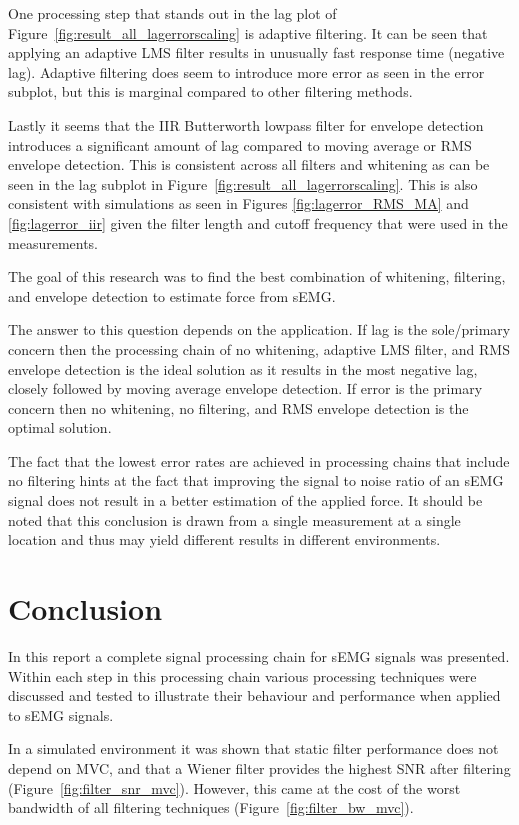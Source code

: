 One processing step that stands out in the lag plot of Figure~\ref{fig:result_all_lagerrorscaling} is adaptive filtering. It can be seen that applying an adaptive LMS filter results in unusually fast response time (negative lag). Adaptive filtering does seem to introduce more error as seen in the error subplot, but this is marginal compared to other filtering methods.

Lastly it seems that the IIR Butterworth lowpass filter for envelope detection introduces a significant amount of lag compared to moving average or RMS envelope detection. This is consistent across all filters and whitening as can be seen in the lag subplot in Figure~\ref{fig:result_all_lagerrorscaling}. This is also consistent with simulations as seen in Figures \ref{fig:lagerror_RMS_MA} and \ref{fig:lagerror_iir} given the filter length and cutoff frequency that were used in the measurements. 

The goal of this research was to find the best combination of whitening, filtering, and envelope detection to estimate force from sEMG. 

The answer to this question depends on the application. If lag is the sole/primary concern then the processing chain of no whitening, adaptive LMS filter, and RMS envelope detection is the ideal solution as it results in the most negative lag, closely followed by moving average envelope detection. If error is the primary concern then no whitening, no filtering, and RMS envelope detection is the optimal solution. 

The fact that the lowest error rates are achieved in processing chains that include no filtering hints at the fact that improving the signal to noise ratio of an sEMG signal does not result in a better estimation of the applied force. It should be noted that this conclusion is drawn from a single measurement at a single location and thus may yield different results in different environments. 

\section{Conclusion}
In this report a complete signal processing chain for sEMG signals was presented. Within each step in this processing chain various processing techniques were discussed and tested to illustrate their behaviour and performance when applied to sEMG signals.

In a simulated environment it was shown that static filter performance does not depend on MVC, and that a Wiener filter provides the highest SNR after filtering (Figure~\ref{fig:filter_snr_mvc}). However, this came at the cost of the worst bandwidth of all filtering techniques (Figure~\ref{fig:filter_bw_mvc}).


